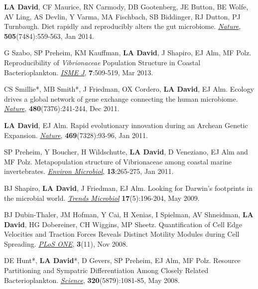 \documentclass[overlapped,line,11pt]{res}
\begin{document}
\begin{resume}
\begin{revnumerate}[17]
\item {\textbf{LA David}, CF Maurice, RN Carmody, DB Gootenberg, JE
  Button, BE Wolfe, AV Ling, AS Devlin, Y Varma, MA Fischbach, SB
  Biddinger, RJ Dutton, PJ Turnbaugh.  Diet rapidly and reproducibly
  alters the gut microbiome. \emph{\underline{Nature}},
  \textbf{505}(7484):559-563, Jan 2014.}

\item {G Szabo, SP Preheim, KM Kauffman, \textbf{LA David}, J Shapiro,
  EJ Alm, MF Polz.  Reproducibility of \emph{Vibrionaceae} Population
  Structure in Coastal Bacterioplankton. \emph{\underline{ISME J}},
  \textbf{7}:509-519, Mar 2013.}

\item {CS Smillie*, MB Smith*, J Friedman, OX Cordero, \textbf{LA
    David}, EJ Alm.  Ecology drives a global network of gene exchange
  connecting the human microbiome. \emph{\underline{Nature}},
  \textbf{480}(7376):241-244, Dec 2011.}

\item {\textbf{LA David}, EJ Alm.  Rapid evolutionary innovation during
  an Archean Genetic Expansion.  \emph{\underline{Nature}},
  \textbf{469}(7328):93-96, Jan 2011.}

\vspace*{1mm}
\item {SP Preheim, Y Boucher, H Wildschutte, \textbf{LA David},
  D Veneziano, EJ Alm and MF Polz.  Metapopulation
  structure of Vibrionaceae among coastal marine
  invertebrates. \emph{\underline{Environ Microbiol}}, \textbf{13}:265-275, Jan 2011.} 

\vspace*{1mm}
\item {BJ Shapiro, \textbf{LA David}, J Friedman, EJ Alm. Looking for
Darwin's footprints in the microbial world.  \emph{\underline{Trends Microbiol}}
\textbf{17}(5):196-204, May 2009.}

\vspace*{1mm}
\item { BJ Dubin-Thaler, JM Hofman, Y Cai, H Xenias, I Spielman, AV
  Shneidman, \textbf{LA David}, HG Dobereiner, CH Wiggins, MP Sheetz.
  Quantification of Cell Edge Velocities and Traction Forces Reveals
  Distinct Motility Modules during Cell Spreading. \emph{\underline{PLoS ONE}},
  \textbf{3}(11), Nov 2008.}

\vspace*{1mm}
\item {DE Hunt*, \textbf{LA David}*, D Gevers, SP Preheim, EJ Alm, MF
Polz.  Resource Partitioning and Sympatric Differentiation Among
Closely Related Bacterioplankton.  \emph{\underline{Science}},
\textbf{320}(5879):1081-85, May 2008.}


\end{revnumerate}
\end{resume}
\end{document}
